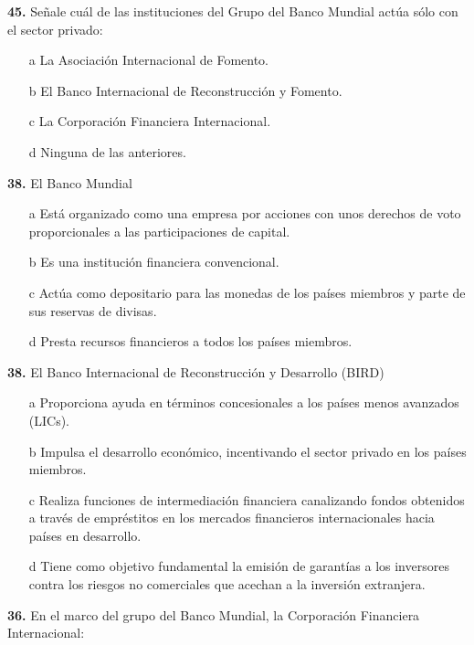 \documentclass{nuevotema}
\begin{document}
\textbf{45.} Señale cuál de las instituciones del Grupo del Banco Mundial actúa sólo con el sector privado:

\begin{itemize}
	\item[a] La Asociación Internacional de Fomento.
	\item[b] El Banco Internacional de Reconstrucción y Fomento.
	\item[c] La Corporación Financiera Internacional.
	\item[d] Ninguna de las anteriores.
\end{itemize}


\textbf{38.} El Banco Mundial

\begin{itemize}
	\item[a] Está organizado como una empresa por acciones con unos derechos de voto proporcionales a las participaciones de capital.
	\item[b] Es una institución financiera convencional.
	\item[c] Actúa como depositario para las monedas de los países miembros y parte de sus reservas de divisas.
	\item[d] Presta recursos financieros a todos los países miembros.
\end{itemize}


\textbf{38.} El Banco Internacional de Reconstrucción y Desarrollo (BIRD)

\begin{itemize}
	\item[a] Proporciona ayuda en términos concesionales a los países menos avanzados (LICs).
	\item[b] Impulsa el desarrollo económico, incentivando el sector privado en los países miembros.
	\item[c] Realiza funciones de intermediación financiera canalizando fondos obtenidos a través de empréstitos en los mercados financieros internacionales hacia países en desarrollo.
	\item[d] Tiene como objetivo fundamental la emisión de garantías a los inversores contra los riesgos no comerciales que acechan a la inversión extranjera.
\end{itemize}


\textbf{36.} En el marco del grupo del Banco Mundial, la Corporación Financiera Internacional:
\end{document}
